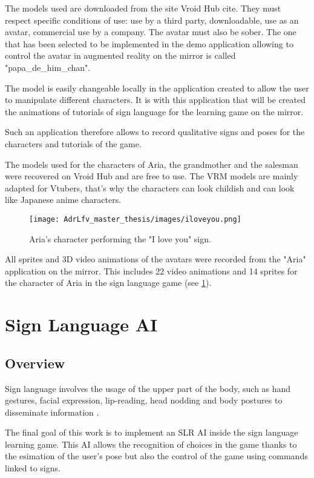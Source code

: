 The models used are downloaded from the site Vroid Hub cite\cite{vroid}. They must respect specific conditions of use: use by a third party, downloadable, use as an avatar, commercial use by a company. The avatar must also be sober. The one that has been selected to be implemented in the demo application allowing to control the avatar in augmented reality on the mirror is called "papa\_de\_him\_chan". 

The model is easily changeable locally in the application created to allow the user to manipulate different characters. It is with this application that will be created the animations of tutorials of sign language for the learning game on the mirror.

Such an application therefore allows to record qualitative signs and poses for the characters and tutorials of the game.

The models used for the characters of Aria, the grandmother and the salesman were recovered on Vroid Hub and are free to use. The VRM models are mainly adapted for Vtubers, that's why the characters can look childish and can look like Japanese anime characters.

\begin{figure}[h]
    \centering
    \texttt{[image: AdrLfv\_master\_thesis/images/iloveyou.png]}
    \caption{Aria's character performing the "I love you" sign.}
    \label{fig:iloveyou}
\end{figure}

All sprites and 3D video animations of the avatars were recorded from the "Aria" application on the mirror. This includes 22 video animations and 14 sprites for the character of Aria in the sign language game (see \ref{fig:iloveyou}).

\section{Sign Language AI}

\subsection{Overview}

Sign language involves the usage of the upper part of the body, such as hand gestures, facial expression, lip-reading, head nodding and body postures to disseminate information \cite{adeyanju2021machine}.

The final goal of this work is to implement an SLR AI inside the sign language learning game. This AI allows the recognition of choices in the game thanks to the esimation of the user's pose but also the control of the game using commands linked to signs.

